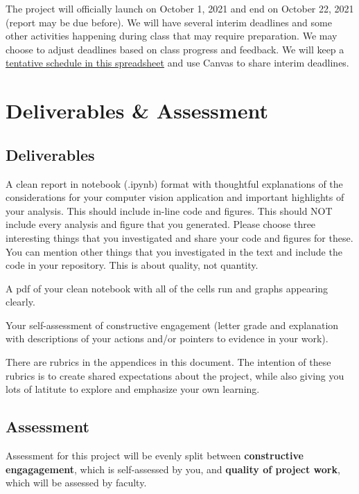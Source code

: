 \documentclass{tufte-handout}
\begin{document}
The project will officially launch on October 1, 2021 and end on October 22, 2021 (report may be due before). We will have several interim deadlines and some other activities happening during class that may require preparation. We may choose to adjust deadlines based on class progress and feedback. We will keep a \href{https://docs.google.com/spreadsheets/d/1TyzKsfdCvZEzfaYswfJSHiYH2JU73gd0KCIOwQijvFo/edit\#gid=952438279}{ tentative schedule in this spreadsheet} and use Canvas to share interim deadlines.


\section{Deliverables \& Assessment}

\subsection{Deliverables}
\be
\item A clean report in notebook (.ipynb) format with thoughtful explanations of the considerations for your computer vision application and important highlights of your analysis. This should include in-line code and figures.
This should NOT include every analysis and figure that you generated. Please choose three interesting things that you investigated and share your code and figures for these. You can mention other things that you investigated in the text and include the code in your repository. This is about quality, not quantity.

\item A pdf of your clean notebook with all of the cells run and graphs appearing clearly.

\item Your self-assessment of constructive engagement (letter grade and explanation with descriptions of your actions and/or pointers to evidence in your work). 
\ee

There are rubrics in the appendices in this document. The intention of these rubrics is to create shared expectations about the project, while also giving you lots of latitute to explore and emphasize your own learning.\\

\subsection{Assessment}

Assessment for this project will be evenly split between \textbf{constructive engagagement}, which is self-assessed by you, and \textbf{quality of project work}, which will be assessed by faculty.
\end{document}
